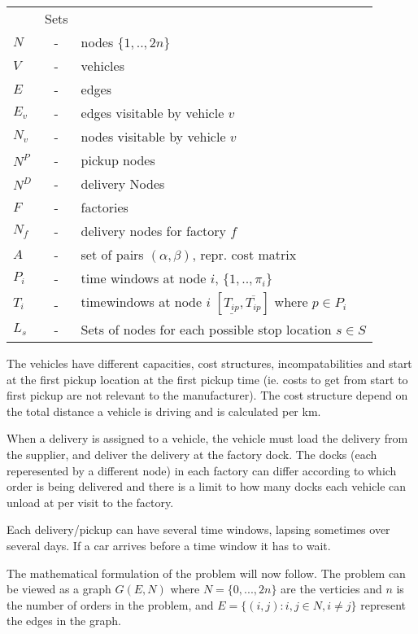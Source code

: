 \documentclass[a4paper,10pt]{article}
\begin{document}
\begin{tabular}{l c l }
          &Sets 						\\ 
    $N    $ &-& nodes $\{1,..,2n\}$ 				\\
    $V    $ &-& vehicles  					\\
    $E    $ &-& edges 						\\
    $E_v  $ &-& edges visitable by vehicle $v$ 			\\
    $N_v  $ &-& nodes visitable by vehicle $v$  		\\
    $N^P  $ &-& pickup nodes 					\\
    $N^D  $ &-& delivery Nodes 					\\
    $F    $ &-& factories 					\\
    $N_f  $ &-& delivery nodes for factory $f$ 			\\
    $A    $ &-& set of pairs $(\alpha, \beta)$, repr. cost matrix	\\
    $P_i  $ &-& time windows at node $i$, $\{1,..,\pi_i \}$	\\
    $T_{i}$ &-& timewindows at node $i$ $[ \underline{T_{ip}},  
		\overline{T_{ip}} ]$ where $p \in P_i$		\\
   $L_s$ &-& Sets of nodes for each possible stop location $s \in S$ 	\\
\end{tabular}
\linebreak
\linebreak
\par

The vehicles have different capacities, cost structures, incompatabilities and start at the first pickup location at the first pickup time (ie. costs to get from start to first pickup are not relevant to the manufacturer).
The cost structure depend on the total distance a vehicle is driving and is calculated per km. \par
When a delivery is assigned to a vehicle, the vehicle must load the delivery from the supplier, and deliver the delivery at the factory dock.
The docks (each reperesented by a different node) in each factory can differ according to which order is being delivered and there is a limit to how many docks each vehicle can unload at per visit to the factory. \par
Each delivery/pickup can have several time windows, lapsing sometimes over several days. If a car arrives before a time window it has to wait. \par
The mathematical formulation of the problem will now follow. 
The problem can be viewed as a graph $G(E,N)$ where $N=\{0,...,2n\}$ are the verticies and $n$ is the number of orders in the problem, and $E=\{(i,j): i,j \in N, i \neq j\}$ represent the edges in the graph.
\linebreak
\end{document}
